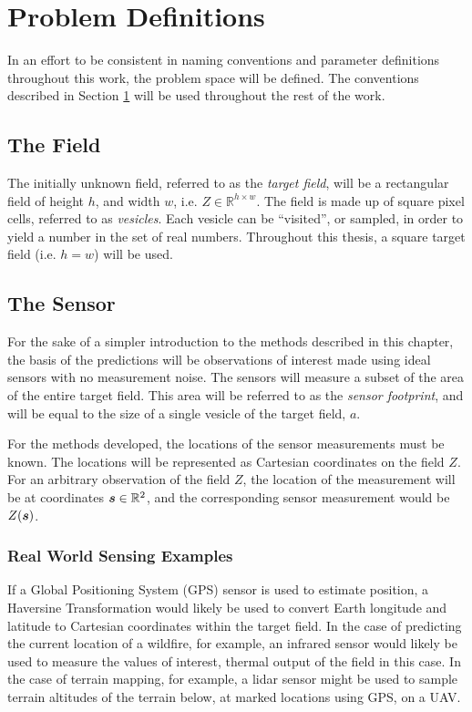 \section{Problem Definitions} \label{ch:defs}
In an effort to be consistent in naming conventions and parameter definitions throughout this work, the problem space will be defined. The conventions described in Section \ref{ch:defs} will be used throughout the rest of the work.

\subsection{The Field}
The initially unknown field, referred to as the \textit{target field}, will be a rectangular field of height $h$, and width $w$, i.e. $Z \in \mathbb{R}^{h \times w}$. The field is made up of square pixel cells, referred to as \textit{vesicles}. Each vesicle can be ``visited'', or sampled, in order to yield a number in the set of real numbers. Throughout this thesis, a square target field (i.e. $h = w$) will be used.

\subsection{The Sensor} \label{sec:sensor_measurements}
For the sake of a simpler introduction to the methods described in this chapter, the basis of the predictions will be observations of interest made using ideal sensors with no measurement noise. The sensors will measure a subset of the area of the entire target field. This area will be referred to as the \textit{sensor footprint}, and will be equal to the size of a single vesicle of the target field, $a$.

For the methods developed, the locations of the sensor measurements must be known. The locations will be represented as Cartesian coordinates on the field $Z$. For an arbitrary observation of the field $Z$, the location of the measurement will be at coordinates ${\it{\boldsymbol{s}}} \in \mathbb{R}^2$, and the corresponding sensor measurement would be $Z({\it{\boldsymbol{s}}})$.

\subsubsection{Real World Sensing Examples}
If a Global Positioning System (GPS) sensor is used to estimate position, a Haversine Transformation would likely be used to convert Earth longitude and latitude to Cartesian coordinates within the target field. In the case of predicting the current location of a wildfire, for example, an infrared sensor would likely be used to measure the values of interest, thermal output of the field in this case. In the case of terrain mapping, for example, a lidar sensor might be used to sample terrain altitudes of the terrain below, at marked locations using GPS, on a UAV.
